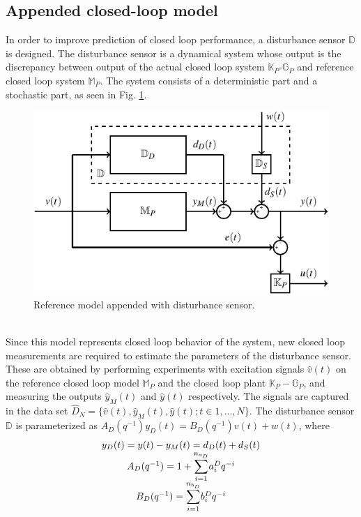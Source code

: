 \documentclass[letterpaper, 10 pt, conference]{ieeeconf}  %
\begin{document}
	\subsection{Appended closed-loop model}
	In order to improve prediction of closed loop performance, a disturbance sensor $\mathbb{D}$ is designed. The disturbance sensor is a dynamical system whose output is the discrepancy between output of the actual closed loop system  $\mathbb{K}_P$-$\mathbb{G}_P$ and reference closed loop system $\mathbb{M}_P$. The system consists of a deterministic part and a stochastic part, as seen in Fig. \ref{Appended}.
	\begin{figure}[h!]
		\hspace{35pt}
		\includegraphics[scale = 0.7]{Mp-D-E.pdf}
		\caption{Reference model appended with disturbance sensor.}
		\label{Appended}
	\end{figure}
	\vspace{-5pt} \\
	Since this model represents closed loop behavior of the system, new closed loop measurements are required to estimate the parameters of the disturbance sensor. These are obtained by performing experiments with excitation signals $\hat{v}(t)$ on the reference closed loop model $\mathbb{M}_P$ and the closed loop plant $\mathbb{K}_P-\mathbb{G}_{P}$, and measuring the outputs $\hat{y}_M(t)$ and $\hat{y}(t)$ respectively. The signals are captured in the data set $\hat{D}_{N}=\{\hat{v}(t),\hat{y}_M(t),\hat{y}(t);t\in{1,...,N}\}$.
	The disturbance sensor $\mathbb{D}$ is parameterized as $A_D(q^{-1})y_D(t) = B_D(q^{-1})v(t)+w(t)$, where 
	\begin{equation*}
	\begin{matrix}
	y_D(t) = y(t) - y_M(t) = d_D(t)+d_S(t) \\ 
	A_D(q^{-1}) = 1+\mathlarger{\sum\limits_{i=1}^{n_{a_D}}}a_i^Dq^{-i}\\
	B_D(q^{-1}) = \mathlarger{\sum\limits_{i=1}^{n_{b_D}}}b_i^Dq^{-i}
	\end{matrix}  
	\end{equation*}
\end{document}
